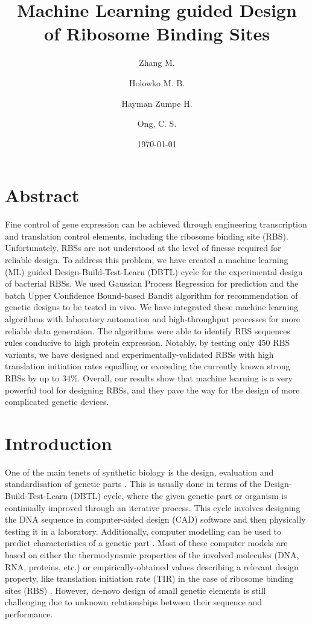 \documentclass{article}
\title{Machine Learning guided Design\\
of Ribosome Binding Sites}
\author[1,2,4]{Zhang M.}
\author[3]{Holowko M. B.}
\author[3]{Hayman Zumpe H.}
\author[1,2,4]{Ong, C. S.}
\affil[1]{Machine Learning and Artificial Intelligence Future Science Platform, CSIRO}
\affil[2]{Department of Computer Science, Australian National University}
\affil[3]{CSIRO Synthetic Biology Future Science Platform, CSIRO Land and Water}
\affil[4]{Data61, CSIRO}
\date{\today{}}
\begin{document}
\maketitle

\section*{Abstract}

Fine control of gene expression can be achieved through engineering transcription and translation control elements, including the ribosome binding site (RBS).
Unfortunately, RBSs are not understood at the level of finesse required for reliable design.
To address this problem, we have created a machine learning (ML) guided Design-Build-Test-Learn (DBTL) cycle for the experimental design of bacterial RBSs.
We used Gaussian Process Regression for prediction and the batch Upper Confidence Bound-based Bandit algorithm for recommendation of genetic designs to be tested in vivo.
We have integrated these machine learning algorithms with laboratory automation and high-throughput processes for more reliable data generation.
The algorithms were able to identify RBS sequences rules conducive to high protein expression.
Notably, by testing only 450 RBS variants, we have designed and experimentally-validated RBSs with high translation initiation rates equalling or exceeding the currently known strong RBSs by up to 34\%.
Overall, our results show that machine learning is a very powerful tool for designing RBSs, and they pave the way for the design of more complicated genetic devices.


\section{Introduction}

One of the main tenets of synthetic biology is the design, evaluation and standardisation of genetic parts \cite{Brophy2014,Canton2008,Stanton2014}.
This is usually done in terms of the Design-Build-Test-Learn (DBTL) cycle, where the given genetic part or organism is continually improved through an iterative process.
This cycle involves designing the DNA sequence in computer-aided design (CAD) software and then physically testing it in a laboratory. 
Additionally, computer modelling can be used to predict characteristics of a genetic part \cite{Yeoh2019,Nielsen2016}.
Most of these computer models are based on either the thermodynamic properties of the involved molecules (DNA, RNA, proteins, etc.) or empirically-obtained values describing a relevant design property, like translation initiation rate (TIR) in the case of ribosome binding sites (RBS) \cite{Xia1998,Chen2013,Reeve2014}.
However, de-novo design of small genetic elements is still challenging due to unknown relationships between their sequence and performance.\\
\end{document}
